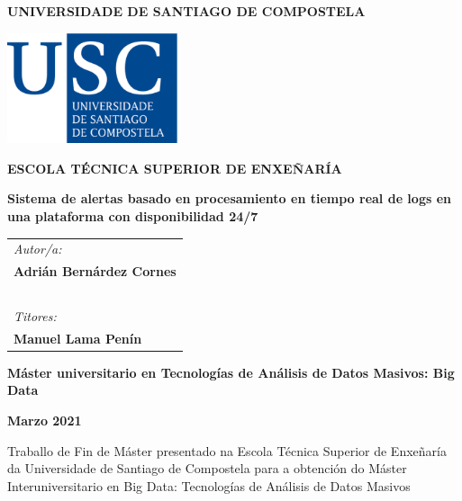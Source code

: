 \pagestyle{empty}
\begin{center}
	{\bf\Large UNIVERSIDADE DE SANTIAGO DE COMPOSTELA}
	
	\vspace{0.5cm}
	\includegraphics[width=5cm]{figuras/logo_usc.eps}
	
	\vspace{0.5cm}
	{\bf\large ESCOLA TÉCNICA SUPERIOR DE ENXEÑARÍA}
	
	\vspace{2cm}
	{\bf\LARGE Sistema de alertas basado en procesamiento en tiempo real de logs en una plataforma con disponibilidad 24/7}
	
\end{center}

\vspace{2cm}
\hspace{4cm}\begin{tabular}{l}
	{\it\Large Autor/a:} \\
	{\bf\Large Adrián Bernárdez Cornes} \\
	~ \\
	{\it\Large Titores:} \\
	{\bf\Large Manuel Lama Penín} \\
\end{tabular}

\vspace{2cm}
\begin{center}
	{\bf\Large Máster universitario en Tecnologías de Análisis de Datos
Masivos: Big Data}
	
	\vspace{0.5cm}
	{\bf\large Marzo 2021}
	
	\vspace{0.5cm}
	Traballo de Fin de Máster presentado na Escola Técnica Superior de Enxeñaría da Universidade de Santiago de Compostela para a obtención do Máster Interuniversitario en Big Data: Tecnologías de Análisis de Datos Masivos
\end{center}

